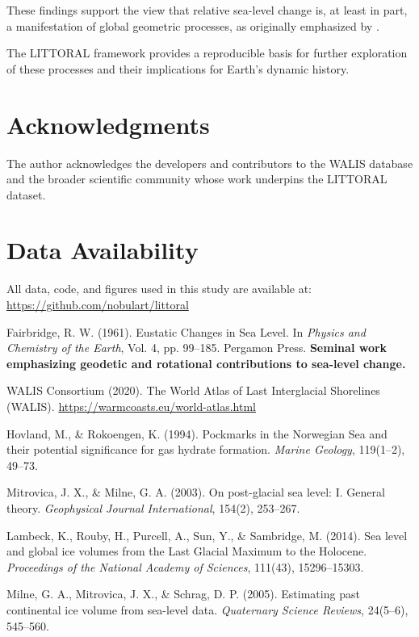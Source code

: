 \documentclass[twocolumn]{article}
\begin{document}
These findings support the view that relative sea-level change is, at least in part, a manifestation of global geometric processes, as originally emphasized by \citet{fairbridge1961}.

The LITTORAL framework provides a reproducible basis for further exploration of these processes and their implications for Earth's dynamic history.

\section*{Acknowledgments}

The author acknowledges the developers and contributors to the WALIS database and the broader scientific community whose work underpins the LITTORAL dataset.

\section*{Data Availability}

All data, code, and figures used in this study are available at:
\url{https://github.com/nobulart/littoral}

\begin{thebibliography}{}

Fairbridge, R. W. (1961).
\newblock Eustatic Changes in Sea Level.
\newblock In \emph{Physics and Chemistry of the Earth}, Vol. 4, pp. 99--185.
\newblock Pergamon Press.
\newblock \textbf{Seminal work emphasizing geodetic and rotational contributions to sea-level change.}

WALIS Consortium (2020).
\newblock The World Atlas of Last Interglacial Shorelines (WALIS).
\newblock \url{https://warmcoasts.eu/world-atlas.html}

Hovland, M., \& Rokoengen, K. (1994).
\newblock Pockmarks in the Norwegian Sea and their potential significance for gas hydrate formation.
\newblock \emph{Marine Geology}, 119(1–2), 49–73.

Mitrovica, J. X., \& Milne, G. A. (2003).
\newblock On post-glacial sea level: I. General theory.
\newblock \emph{Geophysical Journal International}, 154(2), 253–267.

Lambeck, K., Rouby, H., Purcell, A., Sun, Y., \& Sambridge, M. (2014).
\newblock Sea level and global ice volumes from the Last Glacial Maximum to the Holocene.
\newblock \emph{Proceedings of the National Academy of Sciences}, 111(43), 15296–15303.

Milne, G. A., Mitrovica, J. X., \& Schrag, D. P. (2005).
\newblock Estimating past continental ice volume from sea-level data.
\newblock \emph{Quaternary Science Reviews}, 24(5–6), 545–560.

\end{thebibliography}
\end{document}
